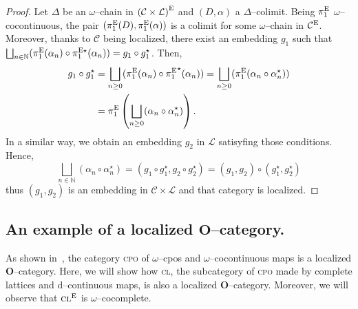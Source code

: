 \begin{proof}
  Let \(\Delta\) be an \(\omega\)--chain in \({(\mathcal{C} \times \mathcal{L})}^\textup{E}\) and \((D,\alpha)\) a \(\Delta\)--colimit. %
  Being \(\pi_1^\textup{E}\) \(\omega\)--cocontinuous, the pair \((\pi_1^\textup{E}(D),\pi_1^\textup{E}(\alpha))\) is a colimit for some \(\omega\)--chain in \(\mathcal{C}^\textup{E}\). %
  Moreover, thanks to \(\mathcal{C}\) being localized, there exist an embedding \(g_1\) such that \(\bigsqcup_{n \in \mathbb{N}}(\pi_1^\textup{E}(\alpha_n) \circ \pi_1^{\textup{E}\star}(\alpha_n)) = g_1 \circ g_1^\star\). %
  Then,
  \begin{equation*}
    \begin{split}
      g_1 \circ g_1^\star &= \bigsqcup_{n \ge 0}(\pi_1^\textup{E}(\alpha_n) \circ {\pi_1^{\textup{E}}}^\star(\alpha_n))
      = \bigsqcup_{n \ge 0}(\pi_1^\textup{E}(\alpha_n\circ \alpha_n^\star)) \\
      &= \pi_1^\textup{E}\left(\bigsqcup_{n \ge 0}(\alpha_n\circ \alpha_n^\star)\right).
    \end{split}
    \end{equation*}
  In a similar way, we obtain an embedding \(g_2\) in \(\mathcal{L}\) satisyfing those conditions.
  Hence,
  \begin{equation*}
    \bigsqcup_{n \in \mathbb{N}}(\alpha_n\circ \alpha_n^\star)
    = (g_1 \circ g_1^\star, g_2 \circ g_2^\star)
    = (g_1,g_2) \circ (g_1^\star,g_2^\star)
  \end{equation*}
  thus \((g_1,g_2)\) is an embedding in \(\mathcal{C} \times \mathcal{L}\) and that category is localized. \qedhere
\end{proof}

\subsection{An example of a localized \(\mathbf{O}\)--category.}

As shown in~\cite{Hemerik1988}, the category \textsc{cpo} of \(\omega\)--cpos and \(\omega\)--cocontinuous maps is a localized \(\mathbf{O}\)--category. %
Here, we will show how \textsc{cl}, the subcategory of \textsc{cpo} made by complete lattices and d--continuous maps, is also a localized \(\mathbf{O}\)--category. %
Moreover, we will observe that \(\mathrm{\textsc{cl}}^\textup{E}\) is \(\omega\)--cocomplete. %

